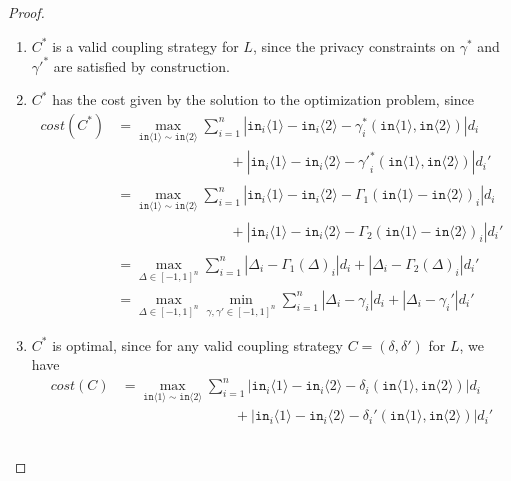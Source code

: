 \documentclass[12pt]{article}
\newcommand{\brangle}[1]{\langle#1 \rangle}
\theoremstyle{definition}
\begin{document}
\begin{proof}
    \begin{enumerate}
        \item $C^*$ is a valid coupling strategy for $L$, since the privacy constraints on $\gamma^*$ and ${\gamma'}^*$ are satisfied by construction.
        \item $C^*$ has the cost given by the solution to the optimization problem, since 
        \begin{align*}
            cost(C^*) &= \max_{\texttt{in}\brangle{1}\sim \texttt{in}\brangle{2}} \sum_{i = 1}^n  |\texttt{in}_i\brangle{1} - \texttt{in}_i\brangle{2} - \gamma_i^*(\texttt{in}\brangle{1}, \texttt{in}\brangle{2})| d_i \\ 
            \phantom{cost(C^*)} &\phantom{=\max_{\texttt{in}\brangle{1}\sim \texttt{in}\brangle{2}}\qquad } + |\texttt{in}_i\brangle{1} - \texttt{in}_i\brangle{2} - {\gamma'}_i^*(\texttt{in}\brangle{1}, \texttt{in}\brangle{2})|d_i' \\
            &= \max_{\texttt{in}\brangle{1}\sim \texttt{in}\brangle{2}} \sum_{i = 1}^n  |\texttt{in}_i\brangle{1} - \texttt{in}_i\brangle{2} - \Gamma_1(\texttt{in}\brangle{1} - \texttt{in}\brangle{2})_i| d_i \\ 
            \phantom{cost(C^*)} &\phantom{=\max_{\texttt{in}\brangle{1}\sim \texttt{in}\brangle{2}}\qquad } + |\texttt{in}_i\brangle{1} - \texttt{in}_i\brangle{2} - \Gamma_2(\texttt{in}\brangle{1} - \texttt{in}\brangle{2})_i|d_i' \\
            &= \max_{\Delta \in [-1, 1]^n} \sum_{i = 1}^n  |\Delta_i - \Gamma_1(\Delta)_i| d_i + |\Delta_i - \Gamma_2(\Delta)_i|d_i' \\
            &= \max_{\Delta \in [-1, 1]^n} \min_{\gamma, \gamma' \in [-1, 1]^n} \sum_{i = 1}^n  |\Delta_i - \gamma_i| d_i + |\Delta_i - \gamma_i'|d_i'
        \end{align*}
        \item $C^*$ is optimal, since for any valid coupling strategy $C = (\delta, \delta')$ for $L$, we have
        \begin{align*}
            cost(C) &= \max_{\texttt{in}\brangle{1}\sim \texttt{in}\brangle{2}} \sum_{i = 1}^n  |\texttt{in}_i\brangle{1} - \texttt{in}_i\brangle{2} - \delta_i(\texttt{in}\brangle{1}, \texttt{in}\brangle{2})| d_i \\
            \phantom{cost(C)} &\phantom{=\max_{\texttt{in}\brangle{1}\sim \texttt{in}\brangle{2}}\qquad } + |\texttt{in}_i\brangle{1} - \texttt{in}_i\brangle{2} - \delta_i'(\texttt{in}\brangle{1}, \texttt{in}\brangle{2})|d_i' \\

\end{align*}
\end{enumerate}
\end{proof}
\end{document}
